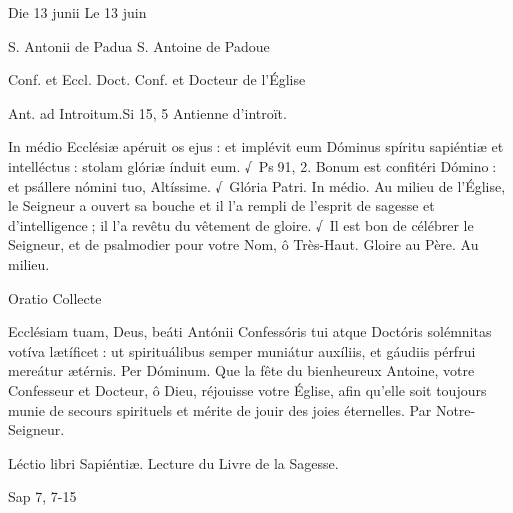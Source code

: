 
\newpage
\begin{paracol}{2}

Die 13 junii
\switchcolumn
Le 13 juin
\switchcolumn*

S. Antonii de Padua
\switchcolumn
S. Antoine de Padoue
\switchcolumn*

Conf. et Eccl. Doct.
\switchcolumn
Conf. et Docteur de l’Église
\switchcolumn*

Ant. ad Introitum.\hfill Si 15, 5
\switchcolumn
Antienne d’introït.
\switchcolumn*

In médio Ecclésiæ apéruit os ejus :  et implévit eum Dóminus spíritu sapiéntiæ et intelléctus : stolam glóriæ índuit eum. √~Ps 91, 2. Bonum est confitéri Dómino : et psállere nómini tuo, Altíssime. √~Glória Patri. In médio.
\switchcolumn
Au milieu de l’Église, le Seigneur a  ouvert sa bouche et il l’a rempli de l’esprit de sagesse et d’intelligence ; il l’a revêtu du vêtement de gloire. √~Il est bon de célébrer le Seigneur, et de psalmodier pour votre Nom, ô Très-Haut. Gloire au Père. Au milieu.
\switchcolumn*

Oratio
\switchcolumn
Collecte
\switchcolumn*

Ecclésiam tuam, Deus, beáti  Antónii Confessóris tui atque Doctóris solémnitas votíva lætíficet : ut spirituálibus semper muniátur auxíliis, et gáudiis pérfrui mereátur ætérnis. Per Dóminum.
\switchcolumn
Que la fête du bienheureux Antoine,  votre Confesseur et Docteur, ô Dieu, réjouisse votre Église, afin qu’elle soit toujours munie de secours spirituels et mérite de jouir des joies éternelles. Par Notre-Seigneur.
\switchcolumn*

Léctio libri Sapiéntiæ.
\switchcolumn
Lecture du Livre de la Sagesse.
\switchcolumn*

Sap 7, 7-15
\switchcolumn

\switchcolumn*


\end{paracol}
